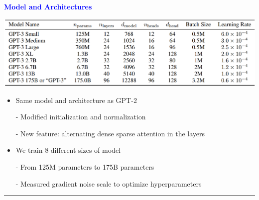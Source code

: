 \documentclass[professionalfont]{beamer}
\begin{document}
\begin{frame}
\begin{refsection}

\begin{center}
    { \textbf{\textcolor{blue}{ {\fontsize{12}{14}\selectfont Model and Architectures} }} }
\end{center}

\begin{center}
    \includegraphics[width=1.0\textwidth]{table//2-1.png}
\end{center}

{\fontsize{10}{14}\selectfont 
\begin{itemize}
    \item Same model and architecture as GPT-2 \cite{gpt2}
    
    - Modified initialization and normalization

    - New feature: alternating dense sparse attention in the layers

    \item We train 8 different sizes of model

    - From 125M parameters to 175B parameters

    - Measured gradient noise scale to optimize hyperparameters
\end{itemize}
}

\vspace{0.2cm}
\hrule
\printbibliography

\end{refsection}
\end{frame}
\end{document}
